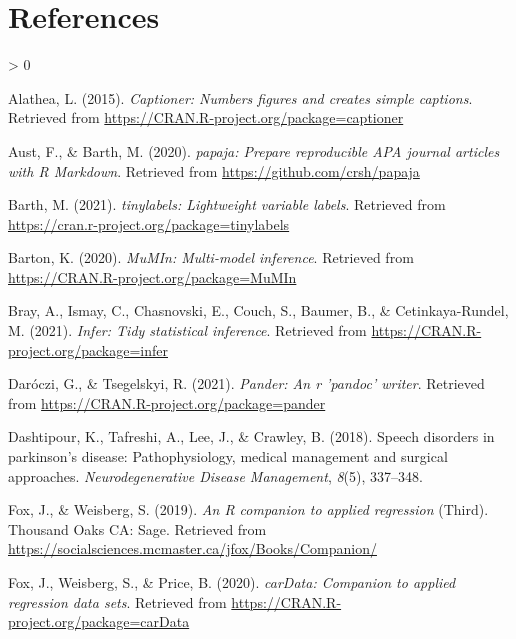 \documentclass[
  english,
  doc,floatsintext]{apa6}
\newlength{\cslhangindent}
\newenvironment{CSLReferences}[2] %
 {%
  \setlength{\parindent}{0pt}
  \ifodd #1 \everypar{\setlength{\hangindent}{\cslhangindent}}\ignorespaces\fi
  \ifnum #2 > 0
  \setlength{\parskip}{#2\baselineskip}
  \fi
 }%
 {}
\begin{document}
\clearpage

\hypertarget{references}{%
\section*{References}\label{references}}

\hypertarget{refs}{}
\begin{CSLReferences}{1}{0}
\leavevmode\hypertarget{ref-R-captioner}{}%
Alathea, L. (2015). \emph{Captioner: Numbers figures and creates simple captions}. Retrieved from \url{https://CRAN.R-project.org/package=captioner}

\leavevmode\hypertarget{ref-R-papaja}{}%
Aust, F., \& Barth, M. (2020). \emph{{papaja}: {Prepare} reproducible {APA} journal articles with {R Markdown}}. Retrieved from \url{https://github.com/crsh/papaja}

\leavevmode\hypertarget{ref-R-tinylabels}{}%
Barth, M. (2021). \emph{{tinylabels}: Lightweight variable labels}. Retrieved from \url{https://cran.r-project.org/package=tinylabels}

\leavevmode\hypertarget{ref-R-MuMIn}{}%
Barton, K. (2020). \emph{MuMIn: Multi-model inference}. Retrieved from \url{https://CRAN.R-project.org/package=MuMIn}

\leavevmode\hypertarget{ref-R-infer}{}%
Bray, A., Ismay, C., Chasnovski, E., Couch, S., Baumer, B., \& Cetinkaya-Rundel, M. (2021). \emph{Infer: Tidy statistical inference}. Retrieved from \url{https://CRAN.R-project.org/package=infer}

\leavevmode\hypertarget{ref-R-pander}{}%
Daróczi, G., \& Tsegelskyi, R. (2021). \emph{Pander: An r 'pandoc' writer}. Retrieved from \url{https://CRAN.R-project.org/package=pander}

\leavevmode\hypertarget{ref-dashtipour2018speech}{}%
Dashtipour, K., Tafreshi, A., Lee, J., \& Crawley, B. (2018). Speech disorders in parkinson's disease: Pathophysiology, medical management and surgical approaches. \emph{Neurodegenerative Disease Management}, \emph{8}(5), 337--348.

\leavevmode\hypertarget{ref-R-car}{}%
Fox, J., \& Weisberg, S. (2019). \emph{An {R} companion to applied regression} (Third). Thousand Oaks {CA}: Sage. Retrieved from \url{https://socialsciences.mcmaster.ca/jfox/Books/Companion/}

\leavevmode\hypertarget{ref-R-carData}{}%
Fox, J., Weisberg, S., \& Price, B. (2020). \emph{carData: Companion to applied regression data sets}. Retrieved from \url{https://CRAN.R-project.org/package=carData}


\end{CSLReferences}
\end{document}
